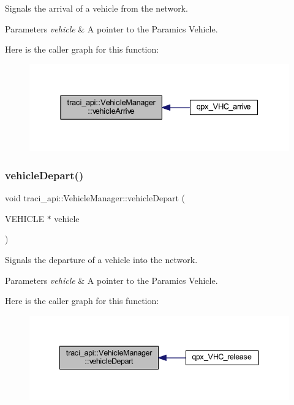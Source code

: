 Signals the arrival of a vehicle from the network. 


\begin{DoxyParams}{Parameters}
{\em vehicle} & A pointer to the Paramics Vehicle. \\
\hline
\end{DoxyParams}
Here is the caller graph for this function\+:\nopagebreak
\begin{figure}[H]
\begin{center}
\leavevmode
\includegraphics[width=331pt]{classtraci__api_1_1_vehicle_manager_a336d2616be8e4e0c9da5d29d7f122ad6_icgraph}
\end{center}
\end{figure}
\mbox{\label{classtraci__api_1_1_vehicle_manager_a6451b873f33f8a6713df294a81b78d3f}} 
\subsubsection{\texorpdfstring{vehicle\+Depart()}{vehicleDepart()}}
{\footnotesize\ttfamily void traci\+\_\+api\+::\+Vehicle\+Manager\+::vehicle\+Depart (\begin{DoxyParamCaption}\item[{V\+E\+H\+I\+C\+LE $\ast$}]{vehicle }\end{DoxyParamCaption})}



Signals the departure of a vehicle into the network. 


\begin{DoxyParams}{Parameters}
{\em vehicle} & A pointer to the Paramics Vehicle. \\
\hline
\end{DoxyParams}
Here is the caller graph for this function\+:\nopagebreak
\begin{figure}[H]
\begin{center}
\leavevmode
\includegraphics[width=340pt]{classtraci__api_1_1_vehicle_manager_a6451b873f33f8a6713df294a81b78d3f_icgraph}
\end{center}
\end{figure}


